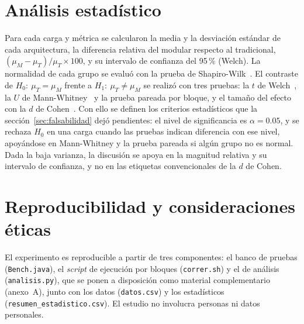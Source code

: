 \section{Análisis estadístico}
\label{sec:analisis}

Para cada carga y métrica se calcularon la media y la desviación estándar de cada arquitectura, la diferencia relativa del modular respecto al tradicional, $(\mu_M - \mu_T)/\mu_T \times 100$, y su intervalo de confianza del 95\,\% (Welch). La normalidad de cada grupo se evaluó con la prueba de Shapiro-Wilk~\cite{shapiro1965}. El contraste de $H_0:\ \mu_T = \mu_M$ frente a $H_1:\ \mu_T \neq \mu_M$ se realizó con tres pruebas: la $t$ de Welch~\cite{welch1947}, la $U$ de Mann-Whitney~\cite{mann1947} y la prueba pareada por bloque, y el tamaño del efecto con la $d$ de Cohen~\cite{cohen1988}. Con ello se definen los criterios estadísticos que la sección~\ref{sec:falsabilidad} dejó pendientes: el nivel de significancia es $\alpha = 0.05$, y se rechaza $H_0$ en una carga cuando las pruebas indican diferencia con ese nivel, apoyándose en Mann-Whitney y la prueba pareada si algún grupo no es normal. Dada la baja varianza, la discusión se apoya en la magnitud relativa y su intervalo de confianza, y no en las etiquetas convencionales de la $d$ de Cohen.

\section{Reproducibilidad y consideraciones éticas}

El experimento es reproducible a partir de tres componentes: el banco de pruebas (\texttt{Bench.java}), el \textit{script} de ejecución por bloques (\texttt{correr.sh}) y el de análisis (\texttt{analisis.py}), que se ponen a disposición como material complementario (anexo~A), junto con los datos (\texttt{datos.csv}) y los estadísticos (\texttt{resumen\_estadistico.csv}). El estudio no involucra personas ni datos personales.
